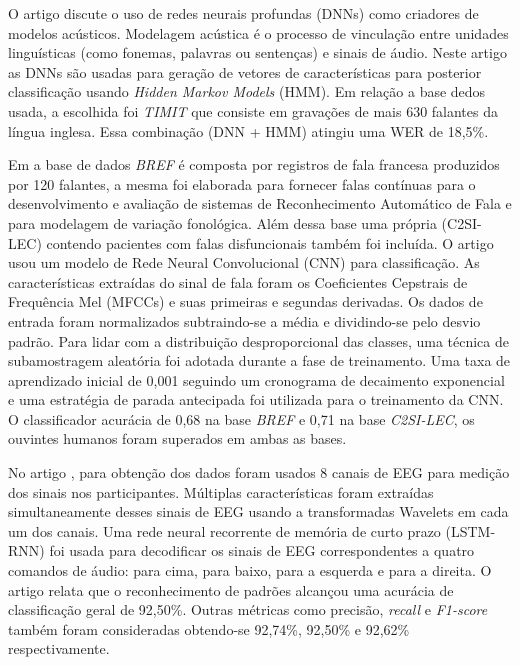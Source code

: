 \documentclass[a4paper,12pt,openright,oneside]{book}
\newenvironment{myenv}[1]
  {\begin{spacing}{#1}}
  {\end{spacing}}
\begin{document}
\begin{myenv}{1.5}
				\par O artigo \cite{6296526} discute o uso de redes neurais profundas (DNNs) como criadores de modelos acústicos. Modelagem acústica é o processo de vinculação entre unidades linguísticas (como fonemas, palavras ou sentenças) e sinais de áudio. Neste artigo as DNNs são usadas para geração de vetores de características para posterior classificação usando \textit{Hidden Markov Models} (HMM). Em relação a base dedos usada, a escolhida foi \textit{TIMIT} que consiste em gravações de mais 630 falantes da língua inglesa. Essa combinação (DNN + HMM) atingiu uma WER de 18,5\%.\newline
				
				\par Em \cite{abderrazek20_interspeech} a base de dados \textit{BREF} é composta por registros de fala francesa produzidos por 120 falantes, a mesma foi elaborada para fornecer falas contínuas para o desenvolvimento e avaliação de sistemas de Reconhecimento Automático de Fala e para modelagem de variação fonológica. Além dessa base uma própria (C2SI-LEC) contendo pacientes com falas disfuncionais também foi incluída. O artigo usou um modelo de Rede Neural Convolucional (CNN) para classificação. As características extraídas do sinal de fala foram os Coeficientes Cepstrais de Frequência Mel (MFCCs) e suas primeiras e segundas derivadas. Os dados de entrada foram normalizados subtraindo-se a média e dividindo-se pelo desvio padrão. Para lidar com a distribuição desproporcional das classes, uma técnica de subamostragem aleatória foi adotada durante a fase de treinamento. Uma taxa de aprendizado inicial de 0,001 seguindo um cronograma de decaimento exponencial e uma estratégia de parada antecipada foi utilizada para o treinamento da CNN. O classificador acurácia de 0,68 na base \textit{BREF} e 0,71 na base \textit{C2SI-LEC}, os ouvintes humanos foram superados em ambas as bases.\newline
				
				\par No artigo \cite{pawar2022wavelet}, para obtenção dos dados foram usados 8 canais de EEG para medição dos sinais nos participantes. Múltiplas características foram extraídas simultaneamente desses sinais de EEG usando a transformadas Wavelets em cada um dos canais. Uma rede neural recorrente de memória de curto prazo (LSTM-RNN) foi usada para decodificar os sinais de EEG correspondentes a quatro comandos de áudio: para cima, para baixo, para a esquerda e para a direita. O artigo relata que o reconhecimento de padrões alcançou uma acurácia de classificação geral de 92,50\%. Outras métricas como precisão, \textit{recall} e \textit{F1-score} também foram consideradas obtendo-se 92,74\%, 92,50\% e 92,62\% respectivamente.\newline
				

\end{myenv}
\end{document}
